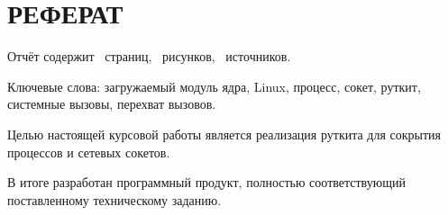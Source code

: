 \chapter*{\hfill{}РЕФЕРАТ\hfill{}}%
\label{cha:referat}

Отчёт содержит
\pageref{LastPage}~страниц,
~рисунков,
~источников.

\sloppy Ключевые слова: загружаемый модуль ядра, Linux, процесс, сокет, руткит, системные вызовы, перехват вызовов.

\sloppy Целью настоящей курсовой работы является реализация руткита для сокрытия процессов и сетевых сокетов. 

\sloppy В итоге разработан программный продукт, полностью соответствующий поставленному техническому заданию.
